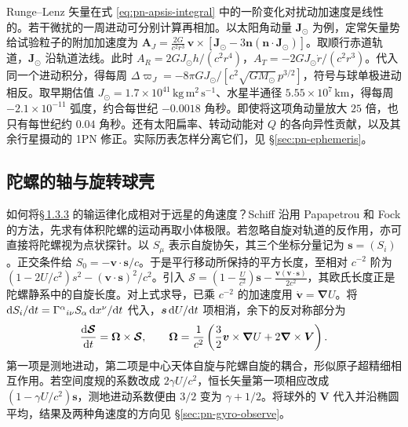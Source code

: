 Runge--Lenz 矢量在式 \eqref{eq:pn-apsis-integral} 中的一阶变化对扰动加速度是线性的。若干微扰的一周进动可分别计算再相加。以太阳角动量 $\bm J_\odot$ 为例，定常矢量势给试验粒子的附加加速度为 $\bm A_J=\frac{2G}{c^2r^3}\,\bm v\times[\bm J_\odot-3\bm n(\bm n\cdot\bm J_\odot)]$。取顺行赤道轨道，$\bm J_\odot$ 沿轨道法线。此时 $A_R=2GJ_\odot h/(c^2r^4)$，$A_T=-2GJ_\odot\dot r/(c^2r^3)$。代入同一个进动积分，得每周 $\Delta\varpi_J=-8\pi GJ_\odot/[c^2\sqrt{GM_\odot}\,p^{3/2}]$，符号与球单极进动相反。取早期估值 $J_\odot=1.7\times10^{41}\,\mathrm{kg\,m^2\,s^{-1}}$、水星半通径 $5.55\times10^7\,\mathrm{km}$，得每周 $-2.1\times10^{-11}$ 弧度，约合每世纪 $-0.0018$ 角秒。即使将这项角动量放大 $25$ 倍，也只有每世纪约 $0.04$ 角秒。还有太阳扁率、转动动能对 $Q$ 的各向异性贡献，以及其余行星摄动的 1PN 修正。实际历表怎样分离它们，见 \S\ref{sec:pn-ephemeris}。

\subsection{陀螺的轴与旋转球壳}\label{sec:pn-transport-shell}

如何将\hyperlink{subsection.1.3.3}{\S\,1.3.3} 的输运律化成相对于远星的角速度？Schiff 沿用 Papapetrou 和 Fock 的方法，先求有体积陀螺的运动再取小体极限。若忽略自旋对轨道的反作用，亦可直接将陀螺视为点状探针。以 $S_\mu$ 表示自旋协矢，其三个坐标分量记为 $\bm s=(S_i)$。正交条件给 $S_0=-\bm v\cdot\bm s/c$。于是平行移动所保持的平方长度，至相对 $c^{-2}$ 阶为 $(1-2U/c^2)s^2-(\bm v\cdot\bm s)^2/c^2$。引入 $\bm{\mathcal S}=\left(1-\frac{U}{c^2}\right)\bm s-\frac{\bm v(\bm v\cdot\bm s)}{2c^2}$，其欧氏长度正是陀螺静系中的自旋长度。对上式求导，已乘 $c^{-2}$ 的加速度用 $\dot{\bm v}=\bm\nabla U$。将 $\dd S_i/\dd t=\Gamma^\alpha{}_{i\nu} S_\alpha\,\dd x^\nu/\dd t$ 代入，$\bm s\,\dd U/\dd t$ 项相消，余下的反对称部分为
\[
 \frac{\dd\bm{\mathcal S}}{\dd t}=\bm\Omega\times\bm{\mathcal S},
 \qquad \bm\Omega=\frac{1}{c^2}
 \left(\frac32\bm v\times\bm\nabla U+2\bm\nabla\times\bm V\right).
\]
第一项是测地进动，第二项是中心天体自旋与陀螺自旋的耦合，形似原子超精细相互作用。若空间度规的系数改成 $2\gamma U/c^2$，恒长矢量第一项相应改成 $(1-\gamma U/c^2)\bm s$，测地进动系数便由 $3/2$ 变为 $\gamma+1/2$。将球外的 $\bm V$ 代入并沿椭圆平均，结果及两种角速度的方向见 \S\ref{sec:pn-gyro-observe}。


